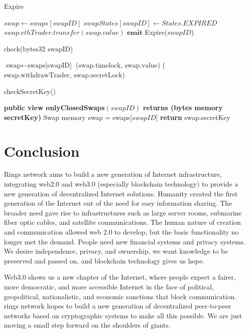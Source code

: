 \documentclass[twocolumn]{article}
\begin{document}
\begin{algorithm}[htbp]
\caption{Expire}
\begin{algorithmic}[1]
\State $swap \gets swaps[{swapID}]$
\State $swapStates[{swapID}] \gets States.EXPIRED$
\State $swap.ethTrader.transfer(swap.value)$
\State $\textbf{emit}$ Expire(${swapID}$)
\EndFunction
\end{algorithmic}
\end{algorithm}

\begin{algorithm}[htbp]
\caption{check(bytes32 $\text{swapID}$)}
\begin{algorithmic}[1]
\State $\text{swap} \gets \text{swaps[}\text{swapID}\text{]}$
\State \Return ($\text{swap.timelock, swap.value}$)
\State \Return ($\text{swap.withdrawTrader, swap.secretLock}$)
\EndFunction
\end{algorithmic}
\end{algorithm}

\begin{algorithm}[htbp]
\caption{checkSecretKey()}
\begin{algorithmic}[1]
\State \textbf{public view onlyClosedSwaps}$({swapID})$
\State \textbf{returns (bytes memory secretKey)}
\State Swap memory swap = swaps[${swapID}$]
\State \textbf{return} swap.secretKey
\EndFunction
\end{algorithmic}
\end{algorithm}

\section{Conclusion}
Rings network aims to build a new generation of Internet infrastructure, integrating web2.0 and web3.0 (especially blockchain technology) to provide a new generation of decentralized Internet solutions. Humanity created the first generation of the Internet out of the need for easy information sharing. The broader need gave rise to infrastructures such as large server rooms, submarine fiber optic cables, and satellite communications. The human nature of creation and communication allowed web 2.0 to develop, but the basic functionality no longer met the demand. People need new financial systems and privacy systems. We desire independence, privacy, and ownership, we want knowledge to be preserved and passed on, and blockchain technology gives us hope.

Web3.0 shows us a new chapter of the Internet, where people expect a fairer, more democratic, and more accessible Internet in the face of political, geopolitical, nationalistic, and economic sanctions that block communication. rings network hopes to build a new generation of decentralized peer-to-peer networks based on cryptographic systems to make all this possible. We are just moving a small step forward on the shoulders of giants.
\end{document}
